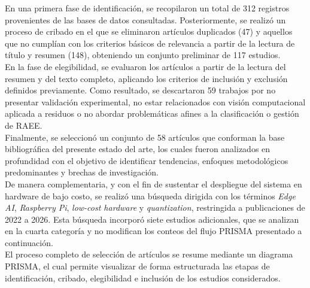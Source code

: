 En una primera fase de identificación, se recopilaron un total de 312 registros provenientes de las bases de datos consultadas. Posteriormente, se realizó un proceso de cribado en el que se eliminaron artículos duplicados (47) y aquellos que no cumplían con los criterios básicos de relevancia a partir de la lectura de título y resumen (148), obteniendo un conjunto preliminar de 117 estudios.\\

En la fase de elegibilidad, se evaluaron los artículos a partir de la lectura del resumen y del texto completo, aplicando los criterios de inclusión y exclusión definidos previamente. Como resultado, se descartaron 59 trabajos por no presentar validación experimental, no estar relacionados con visión computacional aplicada a residuos o no abordar problemáticas afines a la clasificación o gestión de RAEE.\\

Finalmente, se seleccionó un conjunto de 58 artículos que conforman la base bibliográfica del presente estado del arte, los cuales fueron analizados en profundidad con el objetivo de identificar tendencias, enfoques metodológicos predominantes y brechas de investigación.\\

De manera complementaria, y con el fin de sustentar el despliegue del sistema en hardware de bajo costo, se realizó una búsqueda dirigida con los términos \textit{Edge AI}, \textit{Raspberry Pi}, \textit{low-cost hardware} y \textit{quantization}, restringida a publicaciones de 2022 a 2026. Esta búsqueda incorporó siete estudios adicionales, que se analizan en la cuarta categoría y no modifican los conteos del flujo PRISMA presentado a continuación.\\

El proceso completo de selección de artículos se resume mediante un diagrama PRISMA, el cual permite visualizar de forma estructurada las etapas de identificación, cribado, elegibilidad e inclusión de los estudios considerados.

